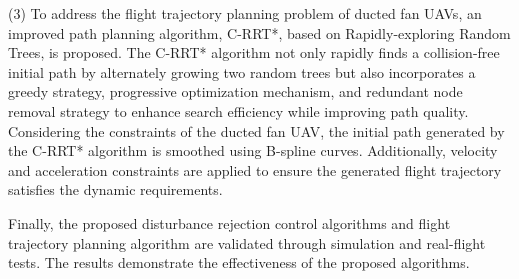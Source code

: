 (3) To address the flight trajectory planning problem of ducted fan UAVs, an improved path planning algorithm, C-RRT*, based on Rapidly-exploring Random Trees, is proposed. The C-RRT* algorithm not only rapidly finds a collision-free initial path by alternately growing two random trees but also incorporates a greedy strategy, progressive optimization mechanism, and redundant node removal strategy to enhance search efficiency while improving path quality. Considering the constraints of the ducted fan UAV, the initial path generated by the C-RRT* algorithm is smoothed using B-spline curves. Additionally, velocity and acceleration constraints are applied to ensure the generated flight trajectory satisfies the dynamic requirements.

Finally, the proposed disturbance rejection control algorithms and flight trajectory planning algorithm are validated through simulation and real-flight tests. The results demonstrate the effectiveness of the proposed algorithms.

